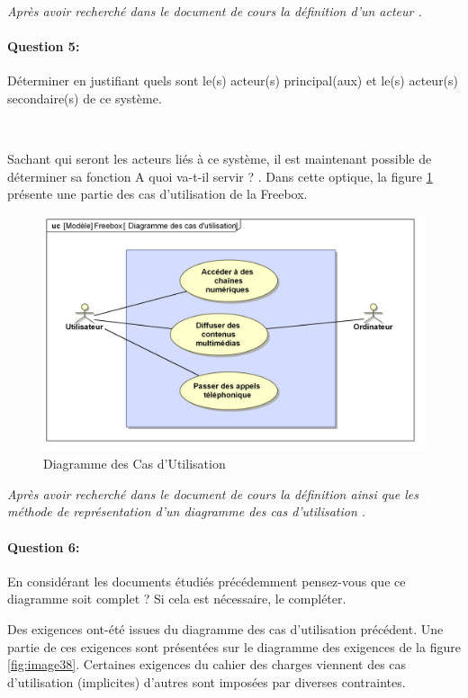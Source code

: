 \textit{Après avoir recherché dans le document de cours la définition d'un \og acteur \fg.}

\paragraph{Question 5:} Déterminer en justifiant quels sont le(s) acteur(s) principal(aux) et le(s) acteur(s) secondaire(s) de ce système.

~\

Sachant qui seront les acteurs liés à ce système, il est maintenant possible de déterminer sa fonction \og A quoi va-t-il servir ? \fg. Dans cette optique, la figure \ref{fig:image3} présente une partie des cas d'utilisation de la Freebox.

\begin{figure}[htbp]
\begin{center}
\includegraphics[width=0.8\linewidth]{img/Freebox_use_case}
\caption{Diagramme des Cas d'Utilisation}
\label{fig:image3}
\end{center}
\end{figure}

\textit{Après avoir recherché dans le document de cours la définition ainsi que les méthode de représentation d'un \og diagramme des cas d'utilisation \fg.}

\paragraph{Question 6:} En considérant les documents étudiés précédemment pensez-vous que ce diagramme soit complet ? Si cela est nécessaire, le compléter.

Des exigences ont-été issues du diagramme des cas d'utilisation précédent. Une partie de ces exigences sont présentées sur le diagramme des exigences de la figure \ref{fig:image38}. Certaines exigences du cahier des charges viennent des cas d'utilisation (implicites) d'autres sont imposées par diverses contraintes.

